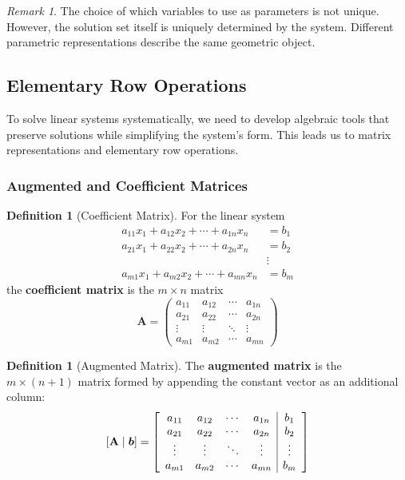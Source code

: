 \documentclass[12pt]{article}
\numberwithin{equation}{section}
\newcommand{\vect}[1]{\boldsymbol{#1}}   %
\newcommand{\mat}[1]{\mathbf{#1}}        %
\newenvironment{amatrix}[1]{%
  \left[\begin{array}{#1}}
  {\end{array}\right]}
\theoremstyle{plain}
\theoremstyle{definition}
\newtheorem{definition}[theorem]{Definition}
\theoremstyle{remark}
\newtheorem{remark}[theorem]{Remark}
\begin{document}
\begin{remark}
The choice of which variables to use as parameters is not unique. However, the solution set itself is uniquely determined by the system. Different parametric representations describe the same geometric object.
\end{remark}

\subsection{Elementary Row Operations}

To solve linear systems systematically, we need to develop algebraic tools that preserve solutions while simplifying the system's form. This leads us to matrix representations and elementary row operations.

\subsubsection{Augmented and Coefficient Matrices}

\begin{definition}[Coefficient Matrix]
For the linear system
\begin{align}
a_{11}x_1 + a_{12}x_2 + \cdots + a_{1n}x_n &= b_1\\
a_{21}x_1 + a_{22}x_2 + \cdots + a_{2n}x_n &= b_2\\
&\vdots\\
a_{m1}x_1 + a_{m2}x_2 + \cdots + a_{mn}x_n &= b_m
\end{align}
the \textbf{coefficient matrix} is the $m \times n$ matrix
$$\mat{A} = \begin{pmatrix}
a_{11} & a_{12} & \cdots & a_{1n}\\
a_{21} & a_{22} & \cdots & a_{2n}\\
\vdots & \vdots & \ddots & \vdots\\
a_{m1} & a_{m2} & \cdots & a_{mn}
\end{pmatrix}$$
\end{definition}

\begin{definition}[Augmented Matrix]
The \textbf{augmented matrix} is the $m \times (n+1)$ matrix formed by appending the constant vector as an additional column:
$$[\mat{A}\mid\vect{b}] = \begin{amatrix}{cccc|c}
a_{11} & a_{12} & \cdots & a_{1n} & b_1\\
a_{21} & a_{22} & \cdots & a_{2n} & b_2\\
\vdots & \vdots & \ddots & \vdots & \vdots\\
a_{m1} & a_{m2} & \cdots & a_{mn} & b_m
\end{amatrix}$$
\end{definition}
\end{document}
